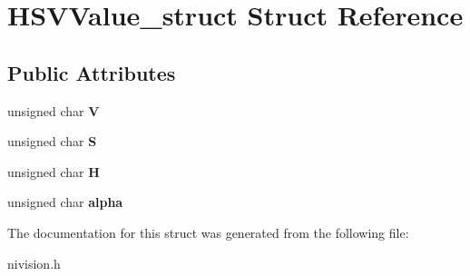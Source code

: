 \hypertarget{structHSVValue__struct}{
\section{HSVValue\_\-struct Struct Reference}
\label{structHSVValue__struct}
}
\subsection*{Public Attributes}
\begin{DoxyCompactItemize}
\item 
\hypertarget{structHSVValue__struct_a8965f5bd36d7372cac50b52dd27d0a89}{
unsigned char {\bfseries V}}
\label{structHSVValue__struct_a8965f5bd36d7372cac50b52dd27d0a89}

\item 
\hypertarget{structHSVValue__struct_a79e9ec0ede08c4425a16909dc38c64dc}{
unsigned char {\bfseries S}}
\label{structHSVValue__struct_a79e9ec0ede08c4425a16909dc38c64dc}

\item 
\hypertarget{structHSVValue__struct_a0de416983c14baaab8f2bdd1e297fd3a}{
unsigned char {\bfseries H}}
\label{structHSVValue__struct_a0de416983c14baaab8f2bdd1e297fd3a}

\item 
\hypertarget{structHSVValue__struct_afce8f1a727f2fdddadc25d30a4897f2c}{
unsigned char {\bfseries alpha}}
\label{structHSVValue__struct_afce8f1a727f2fdddadc25d30a4897f2c}

\end{DoxyCompactItemize}


The documentation for this struct was generated from the following file:\begin{DoxyCompactItemize}
\item 
nivision.h\end{DoxyCompactItemize}

